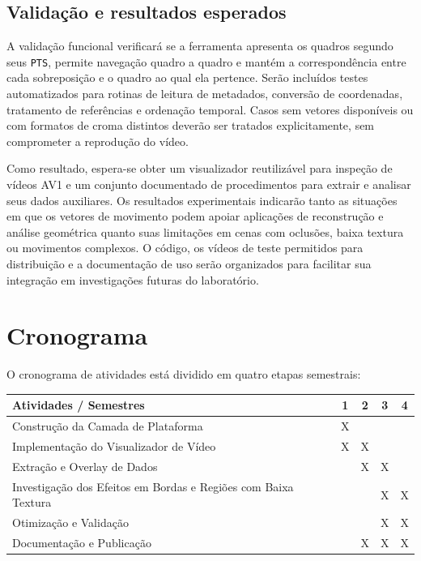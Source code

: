 \documentclass[a4paper,titlepage]{article}
\begin{document}
\subsection{Validação e resultados esperados}

A validação funcional verificará se a ferramenta apresenta os quadros segundo seus \texttt{PTS}, permite navegação quadro a quadro e mantém a correspondência entre cada sobreposição e o quadro ao qual ela pertence. Serão incluídos testes automatizados para rotinas de leitura de metadados, conversão de coordenadas, tratamento de referências e ordenação temporal. Casos sem vetores disponíveis ou com formatos de croma distintos deverão ser tratados explicitamente, sem comprometer a reprodução do vídeo.

Como resultado, espera-se obter um visualizador reutilizável para inspeção de vídeos AV1 e um conjunto documentado de procedimentos para extrair e analisar seus dados auxiliares. Os resultados experimentais indicarão tanto as situações em que os vetores de movimento podem apoiar aplicações de reconstrução e análise geométrica quanto suas limitações em cenas com oclusões, baixa textura ou movimentos complexos. O código, os vídeos de teste permitidos para distribuição e a documentação de uso serão organizados para facilitar sua integração em investigações futuras do laboratório.

\section{Cronograma}

O cronograma de atividades está dividido em quatro etapas semestrais:

\begin{center}
\begin{tabular}{|l|c|c|c|c|}
\hline
\textbf{Atividades / Semestres} & \textbf{1} & \textbf{2} & \textbf{3} & \textbf{4} \\ \hline
Construção da Camada de Plataforma & X & & & \\ \hline
Implementação do Visualizador de Vídeo & X & X & & \\ \hline
Extração e Overlay de Dados & & X & X & \\ \hline
Investigação dos Efeitos em Bordas e Regiões com Baixa Textura & &   & X & X \\ \hline
Otimização e Validação & & & X & X \\ \hline
Documentação e Publicação & & X & X & X \\ \hline
\end{tabular}
\end{center}
\end{document}
